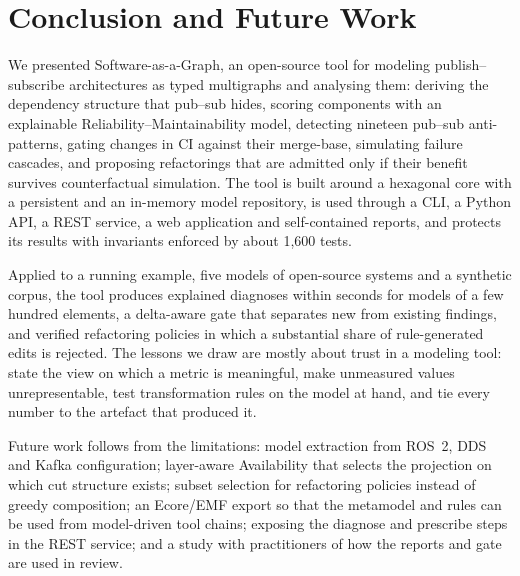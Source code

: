 \section{Conclusion and Future Work}
\label{sec:conclusion}

We presented Software-as-a-Graph, an open-source tool for modeling publish--subscribe architectures as typed multigraphs and analysing them: deriving the dependency structure that pub--sub hides, scoring components with an explainable Reliability--Maintainability model, detecting nineteen pub--sub anti-patterns, gating changes in CI against their merge-base, simulating failure cascades, and proposing refactorings that are admitted only if their benefit survives counterfactual simulation. The tool is built around a hexagonal core with a persistent and an in-memory model repository, is used through a CLI, a Python API, a REST service, a web application and self-contained reports, and protects its results with invariants enforced by about 1,600 tests.

Applied to a running example, five models of open-source systems and a synthetic corpus, the tool produces explained diagnoses within seconds for models of a few hundred elements, a delta-aware gate that separates new from existing findings, and verified refactoring policies in which a substantial share of rule-generated edits is rejected. The lessons we draw are mostly about trust in a modeling tool: state the view on which a metric is meaningful, make unmeasured values unrepresentable, test transformation rules on the model at hand, and tie every number to the artefact that produced it.

Future work follows from the limitations: model extraction from ROS~2, DDS and Kafka configuration; layer-aware Availability that selects the projection on which cut structure exists; subset selection for refactoring policies instead of greedy composition; an Ecore/EMF export so that the metamodel and rules can be used from model-driven tool chains; exposing the diagnose and prescribe steps in the REST service; and a study with practitioners of how the reports and gate are used in review.
